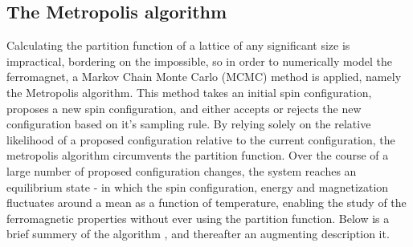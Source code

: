 \documentclass[%
oneside,                 %
final,                   %
10pt]{article}
\begin{document}
\subsection{The Metropolis algorithm}
\label{SS:MCMCmethod}
Calculating the partition function of a lattice of any significant size is impractical, bordering on the impossible, so in order to numerically model the ferromagnet, a Markov Chain Monte Carlo (MCMC) method is applied, namely the Metropolis algorithm. This method takes an initial spin configuration, proposes a new spin configuration, and either accepts or rejects the new configuration based on it's sampling rule. By relying solely on the relative likelihood of a proposed configuration relative to the current configuration, the metropolis algorithm circumvents the partition function. Over the course of a large number of proposed configuration changes, the system reaches an equilibrium state - in which the spin configuration, energy and magnetization fluctuates around a mean as a function of temperature, enabling the study of the ferromagnetic properties without ever using the partition function. Below is a brief summery of the algorithm \cite{HJ-SP}, and thereafter an augmenting description it. 


\begin{center}\end{center}
\end{document}
